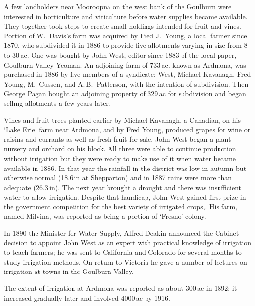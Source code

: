 A few landholders near Mooroopna on the west bank of the Goulburn were
interested in horticulture and viticulture before water supplies
became available.  They together took steps to create small holdings
intended for fruit and vines.  Portion of W.~Davis's farm was acquired
by Fred J.~Young, a local farmer since 1870, who subdivided it in 1886
to provide five allotments varying in size from 8 to 30\,ac. One was
bought by John West, editor since 1883 of the local paper, Goulburn
Valley Yeoman.  An
adjoining farm of 733\,ac, known as Ardmona, was purchased in 1886 by
five members of a syndicate: West, Michael Kavanagh, Fred Young,
M.~Cussen, and A.\,B.~Patterson, with the intention of
subdivision.
Then George Pagan bought an adjoining property of 329\,ac for
subdivision and began selling allotments a few years later.

Vines and fruit trees planted earlier by Michael Kavanagh, a Canadian,
on his `Lake Erie' farm near Ardmona, and by Fred Young, produced
grapes for wine or raisins and currants as well as fresh fruit for
sale.  John West began a plant nursery and orchard on his block.  All
three were able to continue production without irrigation but they
were ready to make use of it when water became available in 1886.  In
that year the rainfall in the district was low in autumn but otherwise
normal (18.6\,in at Shepparton) and in 1887 rains were more than
adequate (26.3\,in).  The next year brought a drought and there was
insufficient water to allow irrigation.  Despite that handicap, John
West gained first prize in the government competition for the best
variety of irrigated crops,. His farm, named Milvina, was reported as
being a portion of `Fresno' colony.

In 1890 the Minister for Water Supply, Alfred Deakin announced the
Cabinet decision to appoint John West as an expert with practical
knowledge of irrigation to teach farmers; he was sent to California
and Colorado for several months to study irrigation
methods.  On return to
Victoria he gave a number of lectures on irrigation at towns in the
Goulburn Valley.

The extent of irrigation at Ardmona was reported as about 300\,ac in
1892; it increased gradually later and involved 4000\,ac by
1916.

